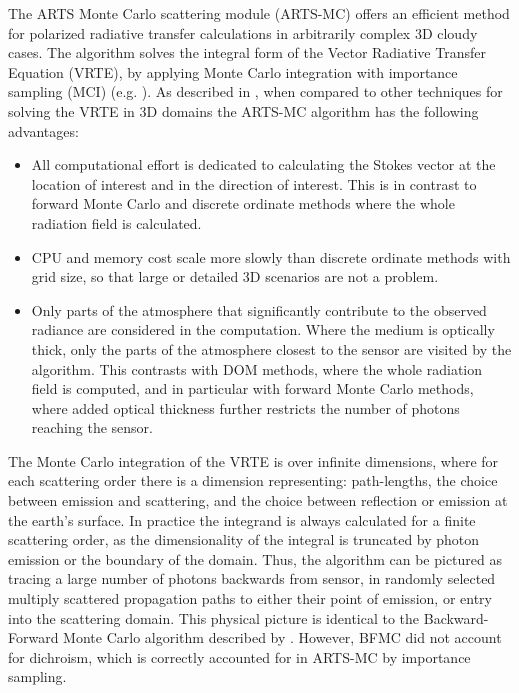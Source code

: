 The ARTS Monte Carlo scattering module (ARTS-MC) offers an efficient method for
polarized radiative transfer calculations in arbitrarily complex 3D
cloudy cases.  The algorithm solves the integral form of the Vector Radiative
Transfer Equation (VRTE), by applying Monte Carlo integration with importance
sampling (MCI) (e.g. \citep{numerical_recipes_C:97}). As described in
\citep{battaglia07:_microw_jqsrt}, when compared to other techniques for solving
the VRTE in 3D domains the ARTS-MC algorithm has the following advantages:
\begin{itemize}
\item All computational effort is dedicated to calculating the Stokes
 vector at the location of interest and in the direction of
 interest. This is in contrast to forward Monte Carlo and discrete ordinate methods
 where the whole radiation field is calculated.
\item CPU and memory cost scale more slowly than discrete ordinate methods with
 grid size, so that large or detailed 3D scenarios are not a problem. 
\item Only parts of the atmosphere that
 significantly contribute to the observed radiance are considered in the
 computation. Where the medium is optically thick, only the parts of the atmosphere closest
 to the sensor are visited by the algorithm.  This contrasts with DOM
 methods, where the whole radiation field is
 computed, and in particular with forward Monte Carlo methods, where added optical thickness
 further restricts the number of photons reaching the sensor.
\end{itemize}

The Monte Carlo integration of the VRTE is over infinite dimensions, where for
each scattering order there is a dimension representing: path-lengths, the
choice between emission and scattering, and the choice between reflection or
emission at the earth's surface.  In practice the integrand is always calculated
for a finite scattering order, as the dimensionality of the integral is
truncated by photon emission or the boundary of the domain.
Thus, the algorithm can be pictured as tracing a large number of photons
backwards from sensor, in randomly selected multiply scattered propagation paths
to either their point of emission, or entry into the scattering domain.  This
physical picture is identical to the Backward-Forward Monte Carlo algorithm
described by \citep{liuetal:96}. However, BFMC did not account for dichroism,
which is correctly accounted for in ARTS-MC by importance sampling.

